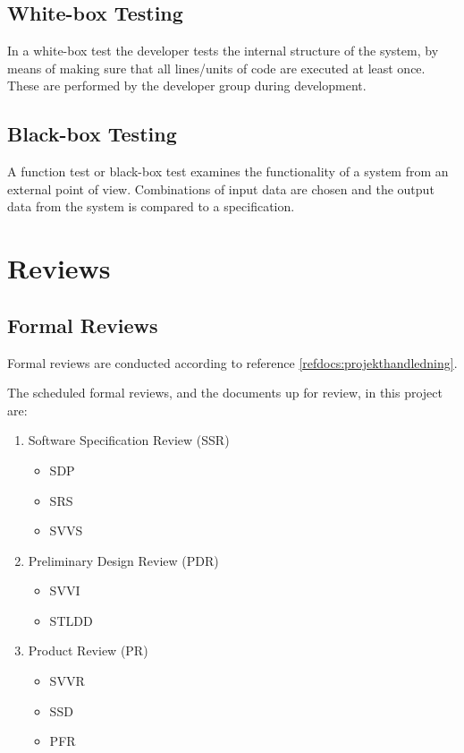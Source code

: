 \documentclass[a4paper]{article}
\begin{document}
\subsection{White-box Testing}
In a white-box test the developer tests the internal structure of the system, by means of making sure that all lines/units of code are executed at least once. These are performed by the developer group during development.

\subsection{Black-box Testing}
A function test or black-box test examines the functionality of a system from an external point of view. Combinations of input data are chosen and the output data from the system is compared to a specification.


\section{Reviews}

\subsection{Formal Reviews}
Formal reviews are conducted according to reference \ref{refdocs:projekthandledning}.

The scheduled formal reviews, and the documents up for review, in this project are:

\begin{enumerate}

\item Software Specification Review (SSR)
\begin{itemize}
\item SDP
\item SRS
\item SVVS
\end{itemize}


\item Preliminary Design Review (PDR)
\begin{itemize}
\item SVVI
\item STLDD
\end{itemize}


\item Product Review (PR)
\begin{itemize}
\item SVVR
\item SSD
\item PFR
\end{itemize}


\end{enumerate}
\end{document}
